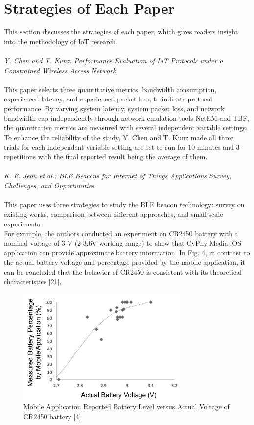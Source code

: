 \documentclass[conference]{IEEEtran}
\begin{document}
\section{Strategies of Each Paper}
This section discusses the strategies of each paper, which gives readers insight into the methodology of IoT research.\\
\\
\textit{Y. Chen and T. Kunz: Performance Evaluation of IoT Protocols under a Constrained Wireless Access Network}
\\
\\
\text{\quad} This paper selects three quantitative metrics, bandwidth consumption, experienced latency, and experienced packet loss, to indicate protocol performance. By varying system latency, system packet loss, and network bandwidth cap independently through network emulation tools NetEM and TBF, the quantitative metrics are measured with several independent variable settings. To enhance the reliability of the study, Y. Chen and T. Kunz made all three trials for each independent variable setting are set to run 
for $10$ minutes and $3$ repetitions with the final reported result being the average of them. 
\\
\\
\textit{K. E. Jeon et al.: BLE Beacons for Internet of Things Applications Survey, Challenges, and Opportunities}
\\
\\
\text{\quad} This paper uses three strategies to study the BLE beacon technology: survey on existing works, comparison between different approaches, and small-scale experiments.\\
\text{\quad} For example, the authors conducted an experiment on CR2450 battery with a nominal voltage of 3 V (2-3.6V working range) to show that CyPhy Media iOS application can provide approximate battery information. In Fig. 4, in contrast to the actual battery voltage and percentage provided by the mobile application, it can be concluded that the behavior of CR2450 is consistent with its theoretical characteristics [21].
\begin{figure}[htbp]
\centerline{\includegraphics[width=8.5cm]{4.png}}
\caption{Mobile Application Reported Battery Level versus Actual Voltage of CR2450 battery [4]}
\label{fig}
\end{figure}
\end{document}
